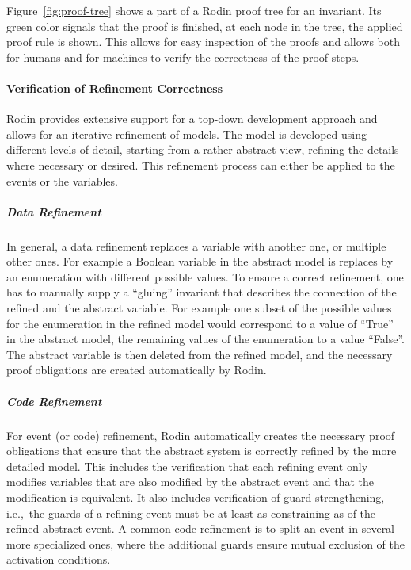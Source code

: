 Figure~\ref{fig:proof-tree} shows a part of a Rodin proof tree for an
invariant. Its green color signals that the proof is finished, at each node in
the tree, the applied proof rule is shown. This allows for easy inspection of
the proofs and allows both for humans and for machines to verify the correctness
of the proof steps.


\paragraph{Verification of Refinement Correctness}
\label{sec:verif-refin-corr}

Rodin provides extensive support for a top-down development approach and allows
for an iterative refinement of models. The model is developed using different
levels of detail, starting from a rather abstract view, refining the details
where necessary or desired. This refinement process can either be applied to
the events or the variables.

\subparagraph{Data Refinement}
\label{sec:data-refinement}

In general, a data refinement replaces a variable with another one, or multiple
other ones. For example a Boolean variable in the abstract model is replaces by
an enumeration with different possible values. To ensure a correct refinement,
one has to manually supply a ``gluing'' invariant that describes the connection
of the refined and the abstract variable. For example one subset of the possible
values for the enumeration in the refined model would correspond to a value of
``True'' in the abstract model, the remaining values of the enumeration to a
value ``False''. The abstract variable is then deleted from the refined model,
and the necessary proof obligations are created automatically by Rodin.


\subparagraph{Code Refinement}
\label{sec:code-refinement}

For event (or code) refinement, Rodin automatically creates the necessary proof
obligations that ensure that the abstract system is correctly refined by the
more detailed model. This includes the verification that each refining event
only modifies variables that are also modified by the abstract event and that
the modification is equivalent. It also includes verification of guard
strengthening, i.e.,\ the guards of a refining event must be at least as
constraining as of the refined abstract event. A common code refinement is to
split an event in several more specialized ones, where the additional guards
ensure mutual exclusion of the activation conditions.


